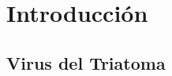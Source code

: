 \documentclass[8pt]{beamer}
\begin{document}
\begin{frame}[t]
  \tableofcontents
\end{frame}


%
%

\section{Introducción}
\subsection{Virus del Triatoma}
\end{document}

